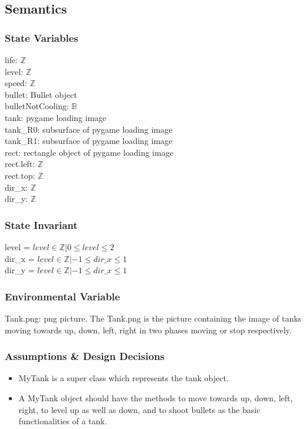 \documentclass[12pt, titlepage]{article}
\begin{document}
		
		\subsection{Semantics}
		\subsubsection{State Variables}
		life: $\mathbb{Z}$\\
		level: $\mathbb{Z}$\\
	    speed: $\mathbb{Z}$\\
		bullet: Bullet object\\
		bulletNotCooling: $\mathbb{B}$\\
		tank: pygame loading image\\
		tank\_R0: subsurface of pygame loading image\\
		tank\_R1: subsurface of pygame loading image\\
		rect: rectangle object of pygame loading image\\
		rect.left: $\mathbb{Z}$\\
		rect.top: $\mathbb{Z}$\\
		dir\_x: $\mathbb{Z}$\\
		dir\_y: $\mathbb{Z}$\\
		
		\subsubsection{State Invariant}
		level = {$level  \in {\mathbb{Z} | 0 \leq level \leq 2 }$}\\
		dir\_x = {$level  \in {\mathbb{Z} | -1 \leq dir\_x \leq 1 }$}\\
		dir\_y = {$level  \in {\mathbb{Z} | -1 \leq dir\_x \leq 1 }$}
		
		\subsubsection{Environmental Variable}
		Tank.png: png picture. The Tank.png is the picture containing the image of tanks moving towards up, down, left, right in two phases moving or stop respectively.\\
		
		\subsubsection{Assumptions \& Design Decisions}
		\begin{itemize}
		\item MyTank is a super class which represents the tank object.
		
		\item A MyTank object should have the methods to move towards up, down, left, right, to level up as well as down, and to shoot bullets as the basic functionalities of a tank. 
		\end{itemize}
\end{document}
